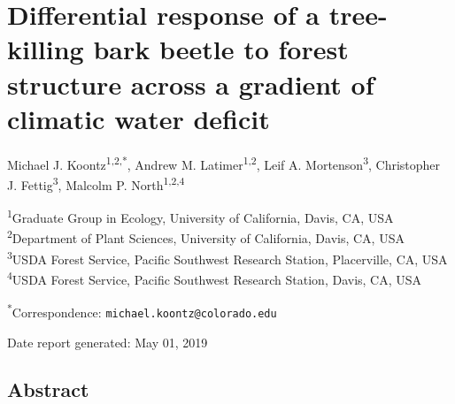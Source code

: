 \documentclass[]{article}
\title{}
\author{}
\date{}
\begin{document}
\section{Differential response of a tree-killing bark beetle to forest
structure across a gradient of climatic water
deficit}\label{differential-response-of-a-tree-killing-bark-beetle-to-forest-structure-across-a-gradient-of-climatic-water-deficit}

Michael J. Koontz\textsuperscript{1,2,*}, Andrew M.
Latimer\textsuperscript{1,2}, Leif A. Mortenson\textsuperscript{3},
Christopher J. Fettig\textsuperscript{3}, Malcolm P.
North\textsuperscript{1,2,4}

\textsuperscript{1}Graduate Group in Ecology, University of California,
Davis, CA, USA\\
\textsuperscript{2}Department of Plant Sciences, University of
California, Davis, CA, USA\\
\textsuperscript{3}USDA Forest Service, Pacific Southwest Research
Station, Placerville, CA, USA\\
\textsuperscript{4}USDA Forest Service, Pacific Southwest Research
Station, Davis, CA, USA

\textsuperscript{*}Correspondence: \texttt{michael.koontz@colorado.edu}

Date report generated: May 01, 2019

\subsection{Abstract}\label{abstract}
\end{document}
